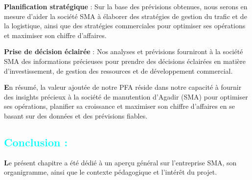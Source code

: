 \documentclass[11pt]{article}
\begin{document}
\textbf{Planification stratégique} : Sur la base des prévisions obtenues, nous serons en mesure d'aider la société SMA à élaborer des stratégies de gestion du trafic et de la logistique, ainsi que des stratégies commerciales pour optimiser ses opérations et maximiser son chiffre d'affaires.

\textbf{Prise de décision éclairée }: Nos analyses et prévisions fourniront à la société SMA des informations précieuses pour prendre des décisions éclairées en matière d'investissement, de gestion des ressources et de développement commercial.\vspace{0.5cm}

\textbf{E}n résumé, la valeur ajoutée de notre PFA réside dans notre capacité à fournir des insights précieux à la société de manutention d'Agadir (SMA) pour optimiser ses opérations, planifier sa croissance et maximiser son chiffre d'affaires en se basant sur des données et des prévisions fiables.


\subsection{\textcolor{cyan}{Conclusion :}} 


\textbf{L}e présent chapitre a été dédié à un aperçu général sur l’entreprise SMA, son organigramme, ainsi que le contexte pédagogique et l’intérêt du projet.
\end{document}
